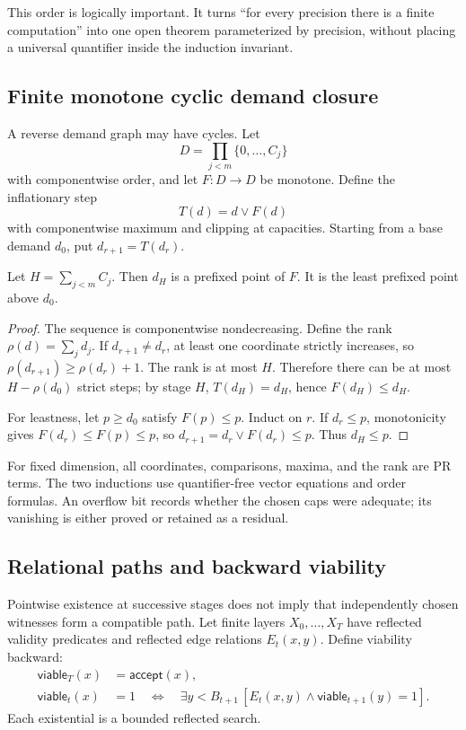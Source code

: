 This order is logically important.  It turns ``for every precision there is a
finite computation'' into one open theorem parameterized by precision, without
placing a universal quantifier inside the induction invariant.

\subsection{Finite monotone cyclic demand closure}

A reverse demand graph may have cycles.  Let
\[
  D=\prod_{j<m}\{0,\ldots,C_j\}
\]
with componentwise order, and let \(F:D\to D\) be monotone.  Define the
inflationary step
\[
  T(d)=d\vee F(d)
\]
with componentwise maximum and clipping at capacities.  Starting from a base
demand \(d_0\), put \(d_{r+1}=T(d_r)\).

\begin{theorem}
\label{thm:demand}
Let \(H=\sum_{j<m}C_j\).  Then \(d_H\) is a prefixed point of \(F\).  It is the
least prefixed point above \(d_0\).
\end{theorem}

\begin{proof}
The sequence is componentwise nondecreasing.  Define the rank
\(\rho(d)=\sum_j d_j\).  If \(d_{r+1}\neq d_r\), at least one coordinate
strictly increases, so \(\rho(d_{r+1})\ge\rho(d_r)+1\).  The rank is at most
\(H\).  Therefore there can be at most \(H-\rho(d_0)\) strict steps; by stage
\(H\), \(T(d_H)=d_H\), hence \(F(d_H)\le d_H\).

For leastness, let \(p\ge d_0\) satisfy \(F(p)\le p\).  Induct on \(r\).  If
\(d_r\le p\), monotonicity gives \(F(d_r)\le F(p)\le p\), so
\(d_{r+1}=d_r\vee F(d_r)\le p\).  Thus \(d_H\le p\).
\end{proof}

For fixed dimension, all coordinates, comparisons, maxima, and the rank are PR
terms.  The two inductions use quantifier-free vector equations and order
formulas.  An overflow bit records whether the chosen caps were adequate; its
vanishing is either proved or retained as a residual.

\subsection{Relational paths and backward viability}

Pointwise existence at successive stages does not imply that independently
chosen witnesses form a compatible path.  Let finite layers
\(X_0,\ldots,X_T\) have reflected validity predicates and reflected edge
relations \(E_t(x,y)\).  Define viability backward:
\[
\begin{aligned}
  \mathsf{viable}_T(x)&=\mathsf{accept}(x),\\
  \mathsf{viable}_t(x)&=1
   \quad\Longleftrightarrow\quad
   \exists y<B_{t+1}\,[E_t(x,y)\wedge\mathsf{viable}_{t+1}(y)=1].
\end{aligned}
\]
Each existential is a bounded reflected search.

